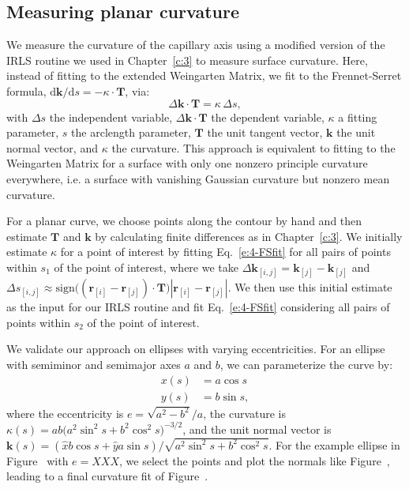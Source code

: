 \subsection{Measuring planar curvature}
We measure the curvature of the capillary axis using a modified version of the IRLS routine we used in Chapter~\ref{c:3} to measure surface curvature.
Here, instead of fitting to the extended Weingarten Matrix, we fit to the Frennet-Serret formula, $\textrm{d}\mathbf{k}/\textrm{d}s = -\kappa \cdot \mathbf{T}$, via:
\begin{equation}
  \Delta \mathbf{k} \cdot \mathbf{T} = \kappa \, \Delta s,\label{e:4-FSfit}
\end{equation}
with $\Delta s$ the independent variable, $\Delta \mathbf{k} \cdot \mathbf{T}$ the dependent variable, $\kappa$ a fitting parameter, $s$ the arclength parameter, $\mathbf{T}$ the unit tangent vector, $\mathbf{k}$ the unit normal vector, and $\kappa$ the curvature.
This approach is equivalent to fitting to the Weingarten Matrix for a surface with only one nonzero principle curvature everywhere, i.e. a surface with vanishing Gaussian curvature but nonzero mean curvature.

For a planar curve, we choose points along the contour by hand and then estimate $\mathbf{T}$ and $\mathbf{k}$ by calculating finite differences as in Chapter~\ref{c:3}.
We initially estimate $\kappa$ for a point of interest by fitting Eq.~\ref{e:4-FSfit} for all pairs of points within $s_1$ of the point of interest, where we take $\Delta \mathbf{k}_{[i,j]} = \mathbf{k}_{[j]} - \mathbf{k}_{[j]}$ and $\Delta s_{[i,j]} \approx \textrm{sign}\big ( (\mathbf{r}_{[i]} - \mathbf{r}_{[j]}) \cdot \mathbf{T}\big ) |\mathbf{r}_{[i]} - \mathbf{r}_{[j]}|$.
We then use this initial estimate as the input for our IRLS routine and fit Eq.~\ref{e:4-FSfit} considering all pairs of points within $s_2$ of the point of interest.

We validate our approach on ellipses with varying eccentricities.
For an ellipse with semiminor and semimajor axes $a$ and $b$, we can parameterize the curve by:
\label{e:4-ellipseParam}
\begin{align}
  x(s) &= a \cos s\tag{\theequation a} \\
  y(s) &= b \sin s\tag{\theequation b},
\end{align}
where the eccentricity is $e = \sqrt{a^2-b^2}/a$, the curvature is $\kappa(s) = a b \big (a^2 \sin^2 s + b^2 \cos^2 s  \big )^{-3/2}$, and the unit normal vector is $\mathbf{k}(s) = (\hat{x} b \cos s + \hat{y} a \sin s)/\sqrt{a^2 \sin^2 s + b^2 \cos^2 s}$.
For the example ellipse in Figure~ with $e = XXX$, we select the points and plot the normals like Figure~, leading to a final curvature fit of Figure~.


